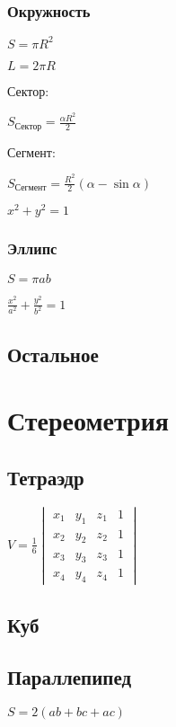 \subsubsection{Окружность}

$ S = \pi R^2 $

$ L = 2 \pi R $

Сектор:

$ S_{\text{Сектор}} = \frac{\alpha R^2}{2} $

Сегмент:

$ S_{\text{Сегмент}} = \frac{R^2}{2} (\alpha - \sin \alpha) $

$ x^2 + y^2 = 1 $

\subsubsection{Эллипс}

$ S = \pi a b $ 

$ \frac{x^2}{a^2} + \frac{y^2}{b^2} = 1 $

\subsection{Остальное}

\section{Стереометрия}

\subsection{Тетраэдр}

$ V = \frac{1}{6} \begin{vmatrix}
	x_1 & y_1 & z_1 & 1 \\
	x_2 & y_2 & z_2 & 1 \\
	x_3 & y_3 & z_3 & 1 \\
	x_4 & y_4 & z_4 & 1
\end{vmatrix} $

\subsection{Куб}

\subsection{Параллепипед}

$ S = 2(ab + bc + ac) $

